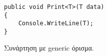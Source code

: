 \begin{listing}[htbp]
\begin{verbatim}
public void Print<T>(T data)
{
    Console.WriteLine(T);
}
\end{verbatim}
\caption{Συνάρτηση με generic όρισμα.}
\label{genericsMethod}
\end{listing}